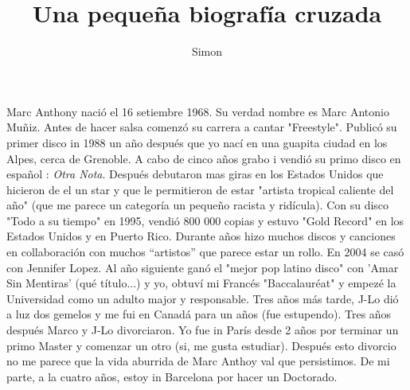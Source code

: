 \documentclass[a4paper]{article}
\author{Simon}
\title{Una peque\~na biograf\'ia cruzada}
\begin{document}
\maketitle
Marc Anthony naci\'o el 16 setiembre 1968. Su verdad nombre es Marc Antonio Mu\~niz. Antes de hacer salsa comenz\'o su carrera a cantar "Freestyle". Public\'o su primer disco in 1988 un a\~no después que yo nac\'i en una guapita ciudad en los Alpes, cerca de Grenoble. A cabo de cinco a\~nos grabo i vendi\'o su primo disco en espa\~nol : \emph{Otra Nota}. Después debutaron mas giras en los Estados Unidos que hicieron de el un star y que le permitieron de estar "artista tropical caliente del a\~no" (que me parece un categor\'ia un peque\~no racista y ridícula). Con su disco "Todo a su tiempo" en 1995, vendi\'o 800 000 copias y estuvo "Gold Record" en los Estados Unidos y en Puerto Rico. Durante a\~nos hizo muchos discos y canciones en collaboraci\'on con muchos ``artistos'' que parece estar un rollo. En 2004 se cas\'o con Jennifer Lopez. Al a\~no siguiente gan\'o el "mejor pop latino disco" con 'Amar Sin Mentiras' (qué t\'itulo...) y yo, obtuv\'i mi Francés "Baccalauréat" y empezé la Universidad como un adulto major y responsable. Tres a\~nos m\'as tarde, J-Lo di\'o a luz dos gemelos y me fui en Canad\'a para un a\~nos (fue estupendo). Tres a\~nos después Marco y J-Lo divorciaron. Yo fue in París desde 2 a\~nos por terminar un primo Master y comenzar un otro (si, me gusta estudiar). Después esto divorcio no me parece que la vida aburrida de Marc Anthoy val que persistimos. De mi parte, a la cuatro a\~nos, estoy in Barcelona por hacer un Doctorado.
\end{document}
